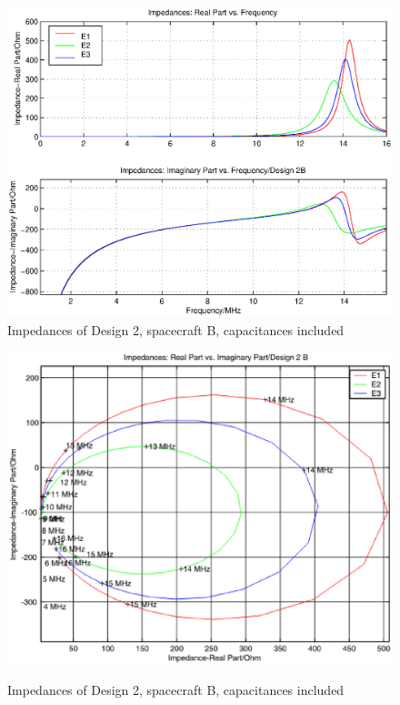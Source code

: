 \documentclass[a4paper,10pt]{thesis}
\begin{document}
\begin{figure}
\begin{center}
\includegraphics[scale=0.65]{ImpedancesD2B1_caps.eps}\\
\caption{Impedances of Design 2, spacecraft B, capacitances included} \label{fig_Impedance1_D2B_caps}
\includegraphics[scale=0.65]{ImpedancesD2B2_caps.eps} \\
\caption{Impedances of Design 2, spacecraft B, capacitances included} \label{fig_Impedance2_D2B_caps}
\end{center}
\end{figure}
\end{document}
